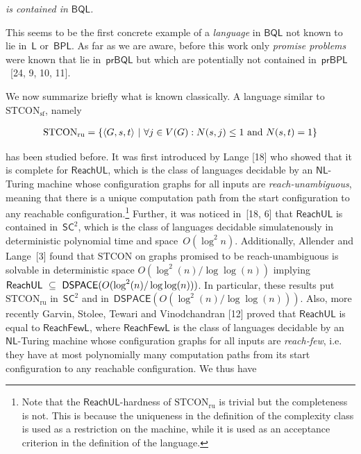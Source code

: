 \documentclass[10pt,a4paper]{article}
\begin{document}
\emph{is contained in $\mathsf{BQL}$.}\par






This seems to be the first concrete example of a \emph{language} in $\mathsf{BQL}$ not known to lie in $\mathsf{L}$ or $\mathsf{BPL}$.
As far as we are aware, before this work only \emph{promise problems} were known that lie in $\mathsf{prBQL}$ but which are potentially not contained in $\mathsf{prBPL}$ [24, 9, 10, 11].\par




We now summarize briefly what is known classically.
A language similar to $\mathrm{STCON}_{\mathrm{sf}}$, namely\par


\[\begin{gathered}
\displaystyle\mathrm{STCON}_{\mathrm{ru}}=\{\langle G,s,t\rangle\nobreak\ |\nobreak\ \forall j\in V(G):N(s,j)\leq 1\text{ and }N(s,t)=1\}
\end{gathered}\]


has been studied before.
It was first introduced by Lange [18] who showed that it is complete for $\mathsf{ReachUL}$, which is the class of languages decidable by an $\mathsf{NL}$-Turing machine whose configuration graphs for all inputs are \emph{reach-unambiguous}, meaning that there is a unique computation path from the start configuration to any reachable configuration.\footnote{Note that the $\mathsf{ReachUL}$-hardness of $\mathrm{STCON}_{\mathrm{ru}}$ is trivial but the completeness is not. This is because the uniqueness in the definition of the complexity class is used as a restriction on the machine, while it is used as an acceptance criterion in the definition of the language.}
Further, it was noticed in [18, 6] that $\mathsf{ReachUL}$ is contained in $\mathsf{SC}^{2}$, which is the class of languages decidable simulatenously in deterministic polynomial time and space $O(\log^{2}n)$.
Additionally, Allender and Lange [3] found that $\mathrm{STCON}$ on graphs promised to be reach-unambiguous is solvable in deterministic space $O(\log^{2}(n)/\log\log(n))$ implying $\mathsf{ReachUL}\nobreak\ \subseteq\nobreak\ \mathsf{DSPACE}(O(\log^{2}(n)/\log\log(n)))$.
In particular, these results put $\mathrm{STCON}_{\mathrm{ru}}$ in $\mathsf{SC}^{2}$ and in $\mathsf{DSPACE}(O(\log^{2}(n)/\log\log(n)))$.
Also, more recently Garvin, Stolee, Tewari and Vinodchandran [12] proved that $\mathsf{ReachUL}$ is equal to $\mathsf{ReachFewL}$, where $\mathsf{ReachFewL}$ is the class of languages decidable by an $\mathsf{NL}$-Turing machine whose configuration graphs for all inputs are \emph{reach-few}, i.e. they have at most polynomially many computation paths from its start configuration to any reachable configuration.
We thus have\par
\end{document}
